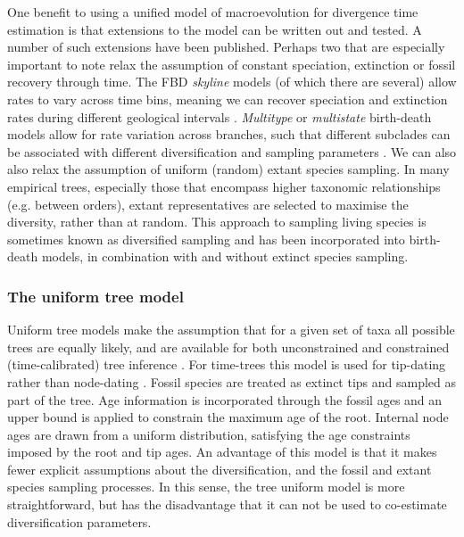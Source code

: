 \documentclass[11pt]{article}
\newcommand{\rw}[1]{{\textcolor{red}{[RW: #1]}}} %
\begin{document}
One benefit to using a unified model of macroevolution for divergence time estimation is that extensions to the model can be written out and tested.
A number of such extensions have been published.
Perhaps two that are especially important to note relax the assumption of constant speciation, extinction or fossil recovery through time. 
The FBD \textit{skyline} models (of which there are several) allow rates to vary across time bins, meaning we can recover speciation and extinction rates during different geological intervals \cite{Stadler2013b,Gavryushkina2014}.
\textit{Multitype} or \textit{multistate} birth-death models allow for rate variation across branches, such that different subclades can be associated with different diversification and sampling parameters \cite{Kuehnert2016,BaridoSottani2018}.
We can also also relax the assumption of uniform (random) extant species sampling.
In many empirical trees, especially those that encompass higher taxonomic relationships (e.g. between orders), extant representatives are selected to maximise the diversity, rather than at random. 
This approach to sampling living species is sometimes known as diversified sampling and has been incorporated into birth-death models, in combination with \cite{Zhang2016} and without \cite{Hoehna2011} extinct species sampling.




\subsubsection{The uniform tree model}

Uniform tree models make the assumption that for a given set of taxa all possible trees are equally likely, and are available for both unconstrained and constrained (time-calibrated) tree inference \cite{Huelsenbeck2001a,Ronquist2012a}.
For time-trees this model is used for tip-dating rather than node-dating \cite{Ronquist2012a}.
Fossil species are treated as extinct tips and sampled as part of the tree.
Age information is incorporated through the fossil ages and an upper bound is applied to constrain the maximum age of the root.
Internal node ages are drawn from a uniform distribution, satisfying the age constraints imposed by the root and tip ages.
An advantage of this model is that it makes fewer explicit assumptions about the diversification, and the fossil and extant species sampling processes. 
In this sense, the tree uniform model is more straightforward, but has the disadvantage that it can not be used to co-estimate diversification parameters.
\end{document}
